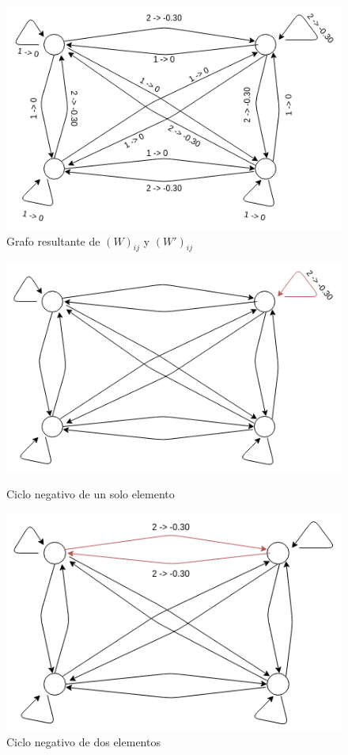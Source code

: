 \begin{figure}[H] 
\centering
\includegraphics[width=.5\textwidth]{img/grafobase.png}
\caption{Grafo resultante de $(W)_{ij}$ y $(W')_{ij}$}
\label{fig:grafobaseconciclos}
\end{figure}

\begin{figure}[H] 
    \centering
    \begin{minipage}{0.45\textwidth}
        \centering
        \includegraphics[width=1\textwidth]{img/ccciclosimple.png} %
        \caption{Ciclo negativo de un solo elemento}
        \label{fig:ciclouno}
    \end{minipage}\hfill
    \begin{minipage}{0.45\textwidth}
        \centering
        \includegraphics[width=1\textwidth]{img/ccciclodoble.png} %
        \caption{Ciclo negativo de dos elementos}
        \label{fig:ciclodos}
    \end{minipage}\hfill
\end{figure}

